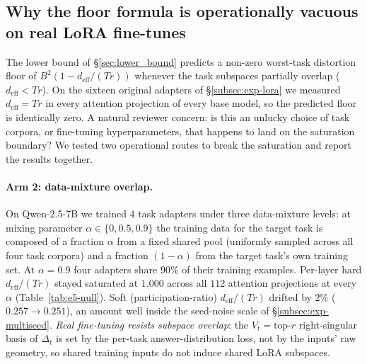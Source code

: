 
\subsection{Why the floor formula is operationally vacuous on real LoRA fine-tunes}
\label{subsec:exp-e5-null}

The lower bound of \S\ref{sec:lower_bound} predicts a non-zero
worst-task distortion floor of $B^2(1 - d_{\mathrm{eff}}/(Tr))$
whenever the task subspaces partially overlap
($d_{\mathrm{eff}} < Tr$). On the sixteen original adapters of
\S\ref{subsec:exp-lora} we measured $d_{\mathrm{eff}} = Tr$ in every
attention projection of every base model, so the predicted floor is
identically zero. A natural reviewer concern: is this an unlucky
choice of task corpora, or fine-tuning hyperparameters, that
happens to land on the saturation boundary? We tested two
operational routes to break the saturation and report the results
together.

\paragraph{Arm 2: data-mixture overlap.}
On Qwen-2.5-7B we trained $4$ task adapters under three
data-mixture levels: at mixing parameter $\alpha \in \{0, 0.5, 0.9\}$
the training data for the target task is composed of a fraction
$\alpha$ from a fixed shared pool (uniformly sampled across all
four task corpora) and a fraction $(1 - \alpha)$ from the target
task's own training set. At $\alpha = 0.9$ four adapters share
$90\%$ of their training examples. Per-layer hard
$d_{\mathrm{eff}}/(Tr)$ stayed saturated at $1.000$ across all $112$
attention projections at every $\alpha$ (Table~\ref{tab:e5-null}).
Soft (participation-ratio) $d_{\mathrm{eff}}/(Tr)$ drifted by
$2\%$ ($0.257 \to 0.251$), an amount well inside the seed-noise
scale of \S\ref{subsec:exp-multiseed}. \emph{Real fine-tuning
resists subspace overlap}: the $V_t = \text{top-}r$ right-singular
basis of $\Delta_t$ is set by the per-task answer-distribution
loss, not by the inputs' raw geometry, so shared training inputs
do not induce shared LoRA subspaces.

